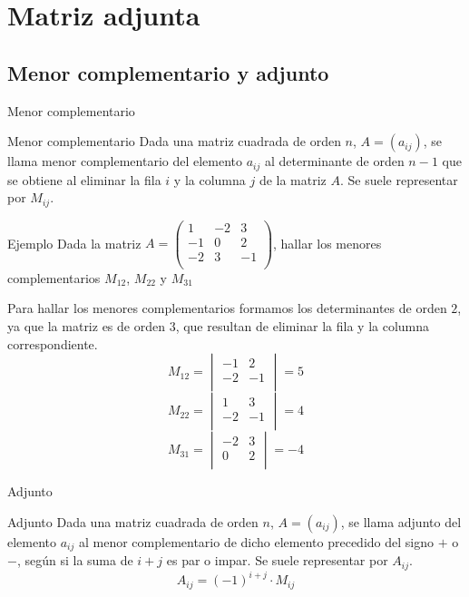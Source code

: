 \documentclass[9pt]{beamer}
\begin{document}
\section{Matriz adjunta}
\subsection{Menor complementario y adjunto}
\begin{frame}{Menor complementario}

\begin{alertblock}{Menor complementario}
Dada una matriz cuadrada de orden $n$, $A=(a_{ij})$, se llama menor complementario del elemento $a_{ij}$ al determinante de orden $n-1$ que se obtiene al eliminar la fila $i$ y la columna $j$ de la matriz $A$. Se suele representar por $M_{ij}$.
\end{alertblock}

\end{frame}

\begin{frame}
\begin{exampleblock}{Ejemplo}
Dada la matriz $A=\begin{pmatrix} 
1 & -2 & 3 \\
-1 & 0 & 2 \\
-2 & 3 & -1 \\
\end{pmatrix}$, hallar los menores complementarios $M_{12}$, $M_{22}$ y $M_{31}$
\end{exampleblock}
\pause
Para hallar los menores complementarios formamos los determinantes de orden $2$, ya que la matriz es de orden $3$, que resultan de eliminar la fila y la columna correspondiente.
\pause
\[ 
M_{12}=\begin{vmatrix}  -1 & 2 \\ -2 & -1 \\ \end{vmatrix}=5 \]
\[ M_{22}=\begin{vmatrix}  1 & 3 \\ -2 & -1 \\ \end{vmatrix}=4 \]
\[M_{31}=\begin{vmatrix}  -2 & 3 \\ 0 & 2 \\ \end{vmatrix}=-4
\]

\end{frame}

\begin{frame}{Adjunto}
\begin{alertblock}{Adjunto}
Dada una matriz cuadrada de orden $n$, $A=(a_{ij})$, se llama adjunto del elemento $a_{ij}$ al menor complementario de dicho elemento precedido del signo $+$ o $-$, según si la suma de $i+j$ es par o impar. Se suele representar por $A_{ij}$.
\[
A_{ij}=(-1)^{i+j} \cdot M_{ij}
\]
\end{alertblock}
\end{frame}
\end{document}

